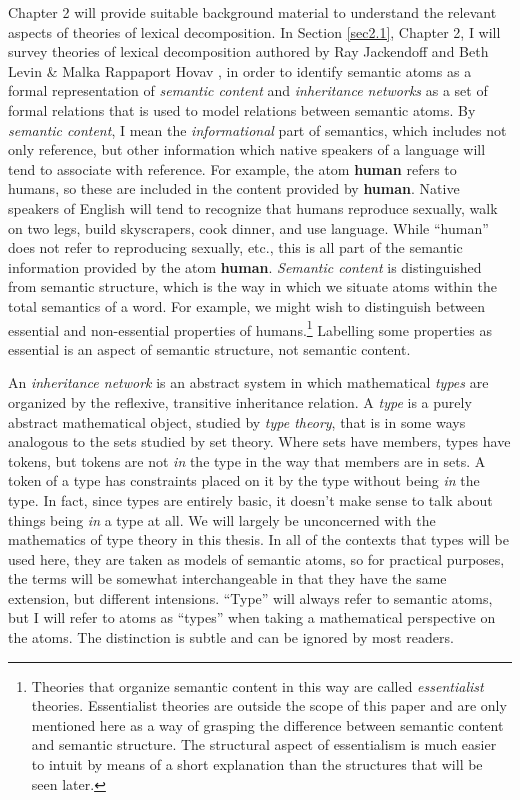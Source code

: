 Chapter 2 will provide suitable background material to understand the relevant aspects of theories of lexical decomposition. In Section \ref{sec2.1}, Chapter 2, I will survey theories of lexical decomposition authored by Ray Jackendoff \cite{jackendoff_semantics_1983} and Beth Levin \& Malka Rappaport Hovav \cite{levin_building_1998}, in order to identify semantic atoms as a formal representation of \emph{semantic content} and \emph{inheritance networks} as a set of formal relations that is used to model relations between semantic atoms. By \emph{semantic content}, I mean the \emph{informational} part of semantics, which includes not only reference, but other information which native speakers of a language will tend to associate with reference. For example, the atom {\bf human} refers to humans, so these are included in the content provided by {\bf human}. Native speakers of English will tend to recognize that humans reproduce sexually, walk on two legs, build skyscrapers, cook dinner, and use language. While ``human'' does not refer to reproducing sexually, etc., this is all part of the semantic information provided by the atom {\bf human}. \emph{Semantic content} is distinguished from semantic structure, which is the way in which we situate atoms within the total semantics of a word. For example, we might wish to distinguish between essential and non-essential properties of humans.\footnote{Theories that organize semantic content in this way are called \emph{essentialist} theories. Essentialist theories are outside the scope of this paper and are only mentioned here as a way of grasping the difference between semantic content and semantic structure. The structural aspect of essentialism is much easier to intuit by means of a short explanation than the structures that will be seen later.} Labelling some properties as essential is an aspect of semantic structure, not semantic content.

An \emph{inheritance network} is an abstract system in which mathematical \emph{types} are organized by the reflexive, transitive inheritance relation. A \emph{type} is a purely abstract mathematical object, studied by \emph{type theory}, that is in some ways analogous to the sets studied by set theory. Where sets have members, types have tokens, but tokens are not \emph{in} the type in the way that members are in sets. A token of a type has constraints placed on it by the type without being \emph{in} the type. In fact, since types are entirely basic, it doesn't make sense to talk about things being \emph{in} a type at all. We will largely be unconcerned with the mathematics of type theory in this thesis. In all of the contexts that types will be used here, they are taken as models of semantic atoms, so for practical purposes, the terms will be somewhat interchangeable in that they have the same extension, but different intensions. ``Type'' will always refer to semantic atoms, but I will refer to atoms as ``types'' when taking a mathematical perspective on the atoms. The distinction is subtle and can be ignored by most readers.


